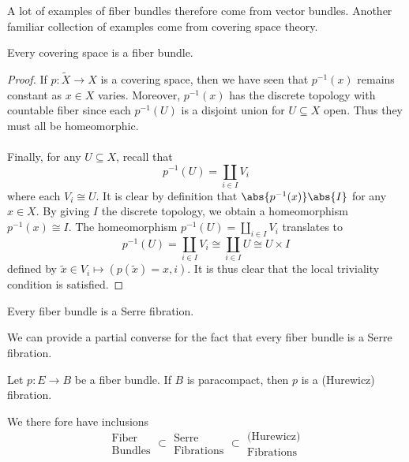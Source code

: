 \documentclass[a4paper]{article}
\begin{document}
A lot of examples of fiber bundles therefore come from vector bundles. Another familiar collection of examples come from covering space theory. 

\begin{lmm}{}{} Every covering space is a fiber bundle. \tcbline
\begin{proof}
If $p:\tilde{X}\to X$ is a covering space, then we have seen that $p^{-1}(x)$ remains constant as $x\in X$ varies. Moreover, $p^{-1}(x)$ has the discrete topology with countable fiber since each $p^{-1}(U)$ is a disjoint union for $U\subseteq X$ open. Thus they must all be homeomorphic. \\~\\

Finally, for any $U\subseteq X$, recall that $$p^{-1}(U)=\coprod_{i\in I}V_i$$ where each $V_i\cong U$. It is clear by definition that $\abs{p^{-1}(x)}\abs{I}$ for any $x\in X$. By giving $I$ the discrete topology, we obtain a homeomorphism $p^{-1}(x)\cong I$. The homeomorphism $p^{-1}(U)=\coprod_{i\in I}V_i$ translates to $$p^{-1}(U)=\coprod_{i\in I}V_i\cong\coprod_{i\in I}U\cong U\times I$$ defined by $\tilde{x}\in V_i\mapsto(p(\tilde{x})=x,i)$. It is thus clear that the local triviality condition is satisfied. 
\end{proof}
\end{lmm}

\begin{prp}{}{} Every fiber bundle is a Serre fibration. 
\end{prp}

We can provide a partial converse for the fact that every fiber bundle is a Serre fibration. 

\begin{prp}{}{} Let $p:E\to B$ be a fiber bundle. If $B$ is paracompact, then $p$ is a (Hurewicz) fibration. 
\end{prp}

We there fore have inclusions $$\substack{\text{Fiber}\\\text{Bundles}}\subset\substack{\text{Serre}\\\text{Fibrations}}\subset\substack{\text{(Hurewicz)}\\\text{Fibrations}}$$
\end{document}
